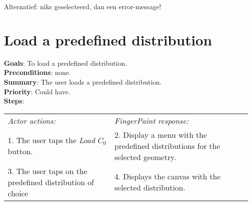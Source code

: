 \begin{appendices}
Alternatief: niks geselecteerd, dan een error-message!

  \section{Load a predefined distribution}
  \label{loadpreddist}
  \textbf{Goals}: To load a predefined distribution.\\
  \textbf{Preconditions}: none.\\
  \textbf{Summary}: The user loads a predefined distribution.\\
  \textbf{Priority}: Could have.\\
  \textbf{Steps}: \\
  \begin{tabular}{ p{} p{} }
  	\emph{Actor actions:} & \emph{FingerPaint response:} \\
	1. The user taps the \emph{Load $C_0$} button. & 2. Display a menu with the predefined distributions for the selected geometry. \\
	3. The user taps on the predefined distribution of choice & 4.	Displays the canvas with the selected distribution. \\
  \end{tabular}


\end{appendices}
